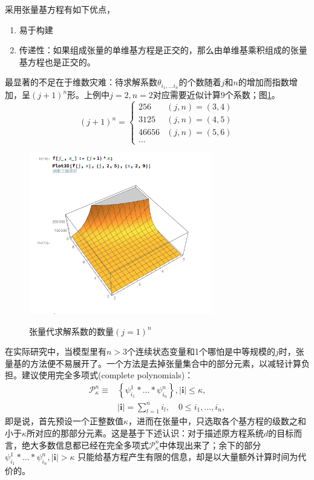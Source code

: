 采用张量基方程有如下优点，
\begin{enumerate}
  \item 易于构建
  \item 传递性：如果组成张量的单维基方程是正交的，那么由单维基乘积组成的张量基方程也是正交的。
\end{enumerate}
最显著的不足在于维数灾难：待求解系数$\theta_{i_1, \ldots i_{n}}$的个数随着$j$和$n$的增加而指数增加，呈$(j+1)^n$形。上例中$j=2,n=2$对应需要近似计算$9$个系数；图\ref{fig:pj-local-tensor-simu}。
\begin{equation*}
(j+1)^n =
\begin{cases}
    256 & (j,n)=(3,4)\\
    3125 & (j,n)=(4,5)\\
    46656 & (j,n)=(5,6)\\
    \ldots
\end{cases}
\end{equation*}
\begin{figure}[htbp]
   \caption[张量模拟]{张量代求解系数的数量$(j=1)^n$}
  \centering
  \includegraphics[width=8cm]{./Figures/20170920-tensor-coefficient}
  \label{fig:pj-local-tensor-simu}
%
\end{figure}

在实际研究中，当模型里有$n>3$个连续状态变量和1个哪怕是中等规模的$j$时，张量基的方法便不易展开了。一个方法是去掉张量集合中的部分元素，以减轻计算负担。\cite{Gaspar:1997we}建议使用完全多项式(complete polynomials)：
\begin{equation}
\begin{split}
    \mathcal{P}^n_{\kappa} \equiv & \left\{ \psi_{i_1}^1 * \ldots * \psi_{i_n}^n \right\}, \left| \bm{i} \right| \le \kappa ,\\
    & \left| \bm{i} \right| = \sum_{l=1}^n i_l, \quad 0 \le i_1,\ldots,i_n,
\end{split}
\end{equation}
即是说，首先预设一个正整数值$\kappa$，进而在张量中，只选取各个基方程的级数之和小于$\kappa$所对应的那部分元素。这是基于下述认识：对于描述原方程系统$d$的目标而言，绝大多数信息都已经在完全多项式$\mathcal{P}^n_{\kappa}$中体现出来了；余下的部分$ \psi_{i_1}^1 * \ldots * \psi_{i_n}^n, \left| \bm{i} \right| > \kappa $ 只能给基方程产生有限的信息，却是以大量额外计算时间为代价的。

